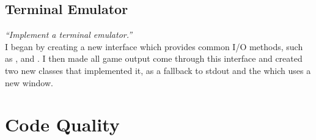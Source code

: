 \documentclass{article}
\begin{document}
\begin{multicols}{2}
                \subsection{Terminal Emulator}
                \textit{``Implement a terminal emulator.''} \\

                I began by creating a new  interface which provides common I/O methods, such as ,  and . I then made all game output come through this interface and created two new classes that implemented it,  as a fallback to stdout and the  which uses a new window.







        \section{Code Quality}


\end{multicols}
\end{document}

